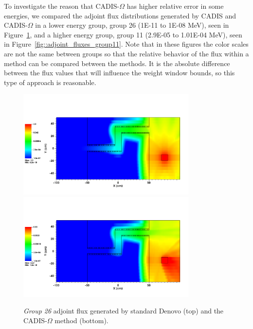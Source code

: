 \documentclass[12pt]{article}
\begin{document}
To investigate the reason that CADIS-$\Omega$ has higher relative error in some energies, we compared the adjoint flux distributions generated by CADIS and CADIS-$\Omega$ in a lower energy group, group 26 (1E-11 to 1E-08 MeV), seen in Figure~\ref{fig::adjoint_fluxes_group26}, and a higher energy group, group 11 (2.9E-05 to 1.01E-04 MeV), seen in Figure~\ref{fig::adjoint_fluxes_group11}.
Note that in these figures the color scales are not the same between groups so that the relative behavior of the flux within a method can be compared between the methods. It is the absolute difference between the flux values that will influence the weight window bounds, so this type of approach is reasonable. 

\begin{figure}
  \begin{center}
    \includegraphics[width=0.80\textwidth]{./images/maze2_adjoint_group26_adjusted.png}
    \includegraphics[width=0.80\textwidth]{./images/maze2_myflux_group26_adjusted.png}
    \caption[]{\label{fig::adjoint_fluxes_group26}\textit{Group 26} adjoint flux generated by standard Denovo (top) and the CADIS-$\Omega$ method (bottom).}
  \end{center}
\end{figure}
\end{document}
